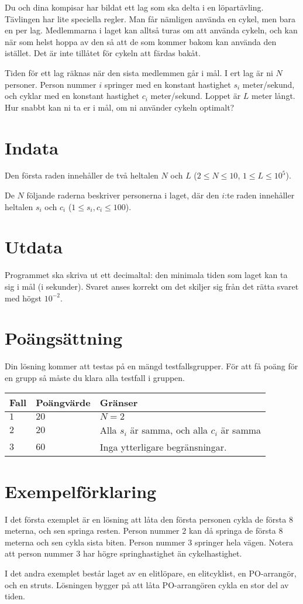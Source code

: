 Du och dina kompisar har bildat ett lag som ska delta i en löpartävling. Tävlingen har lite speciella regler.
Man får nämligen använda en cykel, men bara en per lag. Medlemmarna i laget kan alltså turas om att använda cykeln, och kan
när som helst hoppa av den så att de som kommer bakom kan använda den istället. Det är inte tillåtet för cykeln att färdas bakåt. 

Tiden för ett lag räknas när den sista medlemmen går i mål. I ert lag är ni $N$ personer. Person nummer $i$ springer med en 
konstant hastighet $s_i$ meter/sekund, och cyklar med en konstant hastighet $c_i$ meter/sekund. Loppet är $L$ meter långt.
Hur snabbt kan ni ta er i mål, om ni använder cykeln optimalt?

\section*{Indata}
Den första raden innehåller de två heltalen $N$ och $L$ ($2 \leq N \leq 10$, $1 \leq L \leq 10^5$).

De $N$ följande raderna beskriver personerna i laget, där den $i$:te raden innehåller heltalen $s_i$ och $c_i$ ($1 \leq s_i, c_i \leq 100$).

\section*{Utdata}
Programmet ska skriva ut ett decimaltal: den minimala tiden som laget kan ta sig i mål (i sekunder).
Svaret anses korrekt om det skiljer sig från det rätta svaret med högst $10^{-2}$.

\section*{Poängsättning}
Din lösning kommer att testas på en mängd testfallsgrupper.
För att få poäng för en grupp så måste du klara alla testfall i gruppen.

\noindent
\begin{tabular}{| l | l | l |}
  \hline
  Fall & Poängvärde & Gränser \\ \hline
  $1$    & $20$        &  $N = 2$ \\ \hline 
  $2$    & $20$        &  Alla $s_i$ är samma, och alla $c_i$ är samma \\ \hline 
  $3$    & $60$        &  Inga ytterligare begränsningar. \\ \hline
\end{tabular}

\section*{Exempelförklaring}
I det första exemplet är en lösning att låta den första personen cykla de första $8$ meterna, och sen springa resten. Person nummer $2$
kan då springa de första $8$ meterna och sen cykla sista biten. Person nummer $3$ springer hela vägen. Notera att person nummer $3$ har
högre springhastighet än cykelhastighet.

I det andra exemplet består laget av en elitlöpare, en elitcyklist, en PO-arrangör, och en struts. Lösningen bygger på att låta PO-arrangören
cykla en stor del av tiden.
